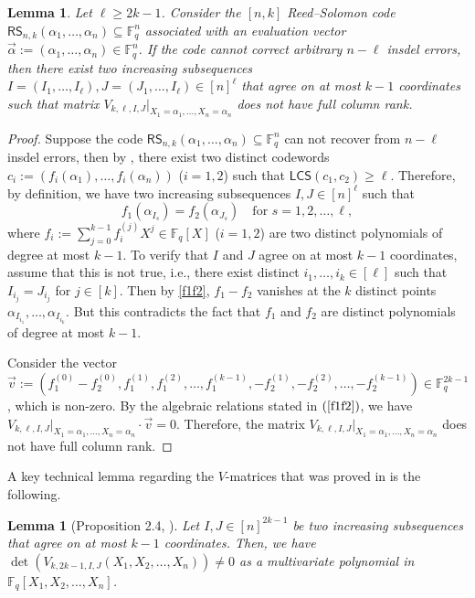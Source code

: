 \documentclass[11pt]{article}
\theoremstyle{plain}
\newtheorem{lemma}[thm]{Lemma}
\theoremstyle{definition}
\theoremstyle{remark}
\newcommand{\F}{\mathbb{F}}
\begin{document}
\begin{lemma}\label{bad}
Let $\ell\ge 2k-1$. 
Consider the $[n, k]$ Reed--Solomon code $\mathsf{RS}_{n,k}(\alpha_1, \ldots, \alpha_n)\subseteq\F_q^n$ associated with an evaluation vector $\vec{\alpha}:=\left(\alpha_1, \ldots, \alpha_n\right)\in\F_q^n$. If 
the code cannot correct arbitrary $n-\ell$ insdel errors, then there exist two increasing subsequences $I=(I_1,\dots,I_\ell), J=(J_1,\dots,I_\ell) \in[n]^{\ell}$ that agree on at most $k-1$ coordinates
such that matrix $V_{k,\ell,I, J}|_{X_{1}=\alpha_{1},\dots,X_{n}=\alpha_{n}}$ does not have full column rank.
\end{lemma}

\begin{proof}
Suppose the code $\mathsf{RS}_{n,k}(\alpha_1, \ldots, \alpha_n)\subseteq\F_q^n$ can not recover from $n-\ell$ insdel errors, then by , there exist two distinct codewords $c_i:=(f_i(\alpha_1),\dots,f_i(\alpha_n))$ ($i=1,2$) such that $\mathsf{LCS}(c_1,c_2)\ge \ell$. Therefore, by definition, we have two increasing subsequences $I,J\in[n]^{\ell}$ such that
\begin{equation}\label{f1f2}
    f_1(\alpha_{I_s})=f_2(\alpha_{J_s}) \quad \text{for } s=1,2,\dots,\ell,
\end{equation}
where $f_i:=\sum_{j=0}^{k-1}f_i^{(j)}X^j\in\F_q[X]$ ($i=1,2$) are two distinct polynomials of degree at most $k-1$. To verify that $I$ and $J$ agree on at most $k-1$ coordinates, assume that this is not true, i.e., there exist distinct $i_1,\dots,i_k\in [\ell]$ such that $I_{i_j}=J_{i_j}$ for $j\in [k]$. Then by \eqref{f1f2}, $f_1-f_2$ vanishes at the $k$ distinct points $\alpha_{I_{i_1}},\dots,\alpha_{I_{i_k}}$.
But this contradicts the fact that $f_1$ and $f_2$ are distinct polynomials of degree at most $k-1$.

Consider the vector $\vec{v}:=\left(f_1^{(0)}-f_2^{(0)},f_1^{(1)},f_1^{(2)},\dots,f_{1}^{(k-1)},-f_2^{(1)},-f_2^{(2)},\dots,-f_{2}^{(k-1)}\right)\in\F_q^{2k-1}$, which is non-zero. 
By the algebraic relations stated in $(\ref{f1f2})$, we have $V_{k,\ell,I, J}|_{X_{1}=\alpha_{1},\dots,X_{n}=\alpha_{n}}\cdot \vec{v}=0$. 
Therefore, the matrix $V_{k,\ell,I, J}|_{X_{1}=\alpha_{1},\dots,X_{n}=\alpha_{n}}$ does not have full column rank.
\end{proof}

A key technical lemma regarding the $V$-matrices that was proved in \cite{con2023reed} is the following.
\begin{lemma}[Proposition 2.4, \cite{con2023reed}]\label{nonzero}
    Let $I, J \in[n]^{2k-1}$ be two increasing subsequences that agree on at most $k-1$ coordinates.  
		Then, we have $\det\left(V_{k,2k-1,I,J}(X_1,X_2,\ldots,X_n)\right)\neq 0$ as a multivariate polynomial in $\F_q[X_1,X_2,\ldots,X_n]$.
\end{lemma}
\end{document}

